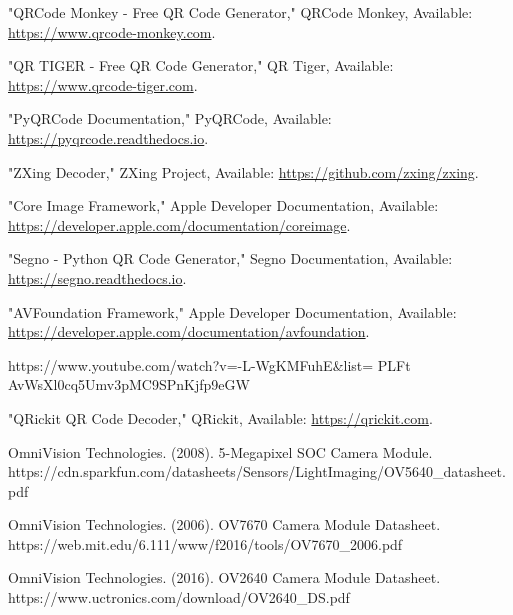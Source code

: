 \begin{thebibliography}{9}
	 "QRCode Monkey - Free QR Code Generator," QRCode Monkey, Available: \url{https://www.qrcode-monkey.com}.
	
	 "QR TIGER - Free QR Code Generator," QR Tiger, Available: \url{https://www.qrcode-tiger.com}.
	
	
	 "PyQRCode Documentation," PyQRCode, Available: \url{https://pyqrcode.readthedocs.io}.

	 "ZXing Decoder," ZXing Project, Available: \url{https://github.com/zxing/zxing}.

	 "Core Image Framework," Apple Developer Documentation, Available: \url{https://developer.apple.com/documentation/coreimage}.

	 "Segno - Python QR Code Generator," Segno Documentation, Available: \url{https://segno.readthedocs.io}.

	 "AVFoundation Framework," Apple Developer Documentation, Available: \url{https://developer.apple.com/documentation/avfoundation}.

	https://www.youtube.com/watch?v=-L-WgKMFuhE\&list=
	PLFt AvWsXl0cq5Umv3pMC9SPnKjfp9eGW

	 "QRickit QR Code Decoder," QRickit, Available: \url{https://qrickit.com}.
	
	OmniVision Technologies. (2008). 5-Megapixel SOC Camera Module. 
	https://cdn.sparkfun.com/datasheets/Sensors/LightImaging/OV5640\_datasheet.pdf
	
	OmniVision Technologies. (2006). OV7670 Camera Module Datasheet. 
	https://web.mit.edu/6.111/www/f2016/tools/OV7670\_2006.pdf
	
	OmniVision Technologies. (2016). OV2640 Camera Module Datasheet. 
	https://www.uctronics.com/download/OV2640\_DS.pdf
	
	
	
\end{thebibliography}